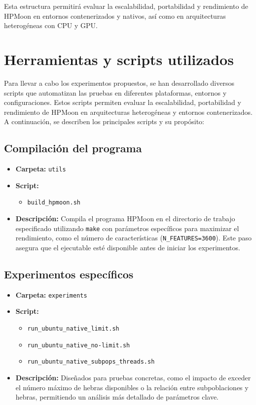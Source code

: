 Esta estructura permitirá evaluar la escalabilidad, portabilidad y rendimiento de HPMoon en entornos contenerizados y nativos, así como en arquitecturas heterogéneas con CPU y GPU.

\section{Herramientas y scripts utilizados}\label{sec:herramientas_scripts}

Para llevar a cabo los experimentos propuestos, se han desarrollado diversos scripts que automatizan las pruebas en diferentes plataformas, entornos y configuraciones. Estos scripts permiten evaluar la escalabilidad, portabilidad y rendimiento de HPMoon en arquitecturas heterogéneas y entornos contenerizados. A continuación, se describen los principales scripts y su propósito:

\subsection{Compilación del programa}
\begin{itemize}
    \item \textbf{Carpeta:} \texttt{utils}
    \item \textbf{Script:}
          \begin{itemize}
              \item \texttt{build\_hpmoon.sh}
          \end{itemize}
    \item \textbf{Descripción:} Compila el programa HPMoon en el directorio de trabajo especificado utilizando \texttt{make} con parámetros específicos para maximizar el rendimiento, como el número de características (\texttt{N\_FEATURES=3600}). Este paso asegura que el ejecutable esté disponible antes de iniciar los experimentos.
\end{itemize}

\subsection{Experimentos específicos}
\begin{itemize}
    \item \textbf{Carpeta:} \texttt{experiments}
    \item \textbf{Script:}
          \begin{itemize}
              \item \texttt{run\_ubuntu\_native\_limit.sh}
              \item \texttt{run\_ubuntu\_native\_no-limit.sh}
              \item \texttt{run\_ubuntu\_native\_subpops\_threads.sh}
          \end{itemize}
    \item \textbf{Descripción:} Diseñados para pruebas concretas, como el impacto de exceder el número máximo de hebras disponibles o la relación entre subpoblaciones y hebras, permitiendo un análisis más detallado de parámetros clave.
\end{itemize}

